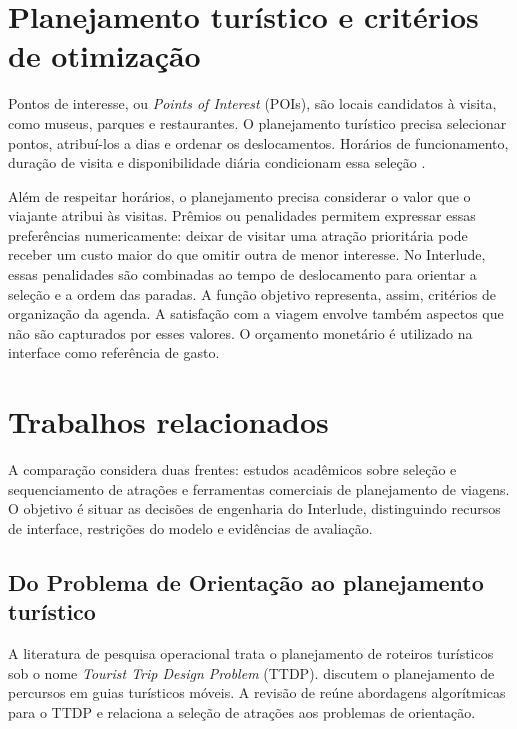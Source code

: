 \section{Planejamento turístico e critérios de otimização}

Pontos de interesse, ou \textit{Points of Interest} (POIs), são locais candidatos à visita, como museus, parques e restaurantes. O planejamento turístico precisa selecionar pontos, atribuí-los a dias e ordenar os deslocamentos. Horários de funcionamento, duração de visita e disponibilidade diária condicionam essa seleção \cite{gavalas2014survey}.

Além de respeitar horários, o planejamento precisa considerar o valor que o viajante atribui às visitas. Prêmios ou penalidades permitem expressar essas preferências numericamente: deixar de visitar uma atração prioritária pode receber um custo maior do que omitir outra de menor interesse. No Interlude, essas penalidades são combinadas ao tempo de deslocamento para orientar a seleção e a ordem das paradas. A função objetivo representa, assim, critérios de organização da agenda. A satisfação com a viagem envolve também aspectos que não são capturados por esses valores. O orçamento monetário é utilizado na interface como referência de gasto.

\section{Trabalhos relacionados}
\label{sec:trabalhos-relacionados}

A comparação considera duas frentes: estudos acadêmicos sobre seleção e sequenciamento de atrações e ferramentas comerciais de planejamento de viagens. O objetivo é situar as decisões de engenharia do Interlude, distinguindo recursos de interface, restrições do modelo e evidências de avaliação.

\subsection{Do Problema de Orientação ao planejamento turístico}

A literatura de pesquisa operacional trata o planejamento de roteiros turísticos sob o nome \textit{Tourist Trip Design Problem} (TTDP).  discutem o planejamento de percursos em guias turísticos móveis. A revisão de  reúne abordagens algorítmicas para o TTDP e relaciona a seleção de atrações aos problemas de orientação.


